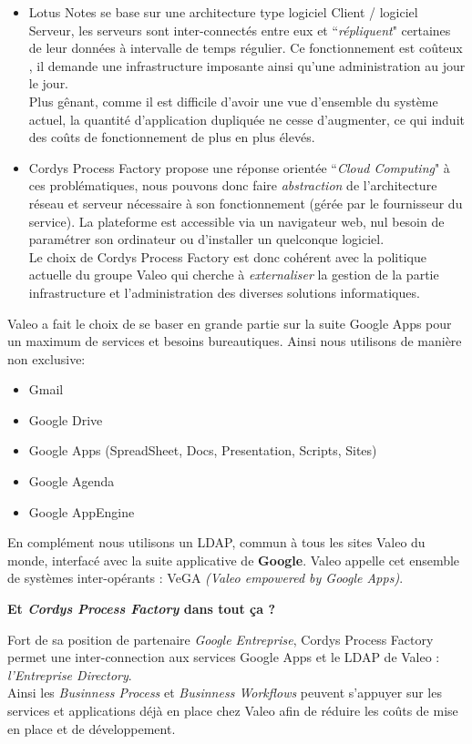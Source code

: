 \begin{itemize}
		\item Lotus Notes se base sur une architecture type logiciel Client / logiciel Serveur, les serveurs sont inter-connectés entre eux et ``\textit{répliquent}" certaines de leur données à intervalle de temps régulier. Ce fonctionnement est coûteux , il demande une infrastructure imposante ainsi qu'une administration au jour le jour. \\
		Plus gênant, comme il est difficile d'avoir une vue d'ensemble du système actuel, la quantité d'application dupliquée ne cesse d'augmenter, ce qui induit des coûts de fonctionnement de plus en plus élevés.\\

	\item Cordys Process Factory propose une réponse orientée ``\textit{Cloud Computing}" à ces problématiques, nous pouvons donc faire \textit{abstraction} de l'architecture réseau et serveur nécessaire à son fonctionnement (gérée par le fournisseur du service). La plateforme est accessible via un navigateur web, nul besoin de paramétrer son ordinateur ou d'installer un quelconque logiciel.\\
	Le choix de Cordys Process Factory est donc cohérent avec la politique actuelle du groupe Valeo qui cherche à \emph{externaliser} la gestion de la partie infrastructure et l'administration des diverses solutions informatiques.\\
	\end{itemize}


Valeo a fait le choix de se baser en grande partie sur la suite Google Apps pour un maximum de services et besoins bureautiques. Ainsi nous utilisons de manière non exclusive: 

	\begin{itemize}
		\item Gmail
		\item Google Drive
		\item Google Apps (SpreadSheet, Docs, Presentation, Scripts, Sites)
		\item Google Agenda 
		\item Google AppEngine
	\end{itemize}

En complément nous utilisons un LDAP, commun à tous les sites Valeo du monde, interfacé avec la suite applicative de \textbf{Google}. Valeo appelle cet ensemble de systèmes inter-opérants  : VeGA \textit{(Valeo empowered by Google Apps)}.

\textbf{Et \textit{Cordys Process Factory} dans tout ça ?}

Fort de sa position de partenaire \emph{Google Entreprise}, Cordys Process Factory permet une inter-connection aux services Google Apps  et le LDAP de Valeo : \textit{l'Entreprise Directory}.\\
Ainsi les \textit{Businness Process} et \textit{Businness Workflows} peuvent s'appuyer sur les services et applications déjà en place chez Valeo afin de réduire les coûts de mise en place et de développement.

\clearpage